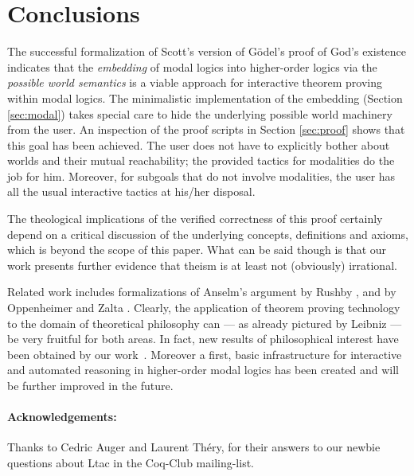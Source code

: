 \documentclass{llncs}
\begin{document}
\section{Conclusions}
\label{sec:conclusions}

The successful formalization of Scott's version of G\"odel's proof of
God's existence indicates that the \emph{embedding} of modal logics
into higher-order logics via the \emph{possible world semantics} is a
viable approach for interactive theorem proving within modal logics.
The minimalistic implementation of the embedding (Section
\ref{sec:modal}) takes special care to hide the underlying possible
world machinery from the user.  An inspection of the proof scripts in
Section \ref{sec:proof} shows that this goal has been achieved. The
user does not have to explicitly bother about worlds and their mutual
reachability; the provided tactics for modalities do the job for him.
Moreover, for subgoals that do not involve modalities, the user has all the
usual interactive tactics at his/her disposal.

The theological implications of the verified correctness of this proof
certainly depend on a critical discussion of the underlying concepts,
definitions and axioms, which is beyond the scope of this paper. What
can be said though is that our work presents further evidence that
theism is at least not (obviously) irrational. 

Related work includes formalizations of Anselm's argument by Rushby
\cite{Rushby}, and by Oppenheimer and Zalta \cite{Zalta}.  Clearly,
the application of theorem proving technology to the domain of
theoretical philosophy can --- as already pictured by Leibniz ---
be very fruitful for both areas. In fact, new results of
philosophical interest have been obtained by our
work~\cite{arXiv}. Moreover a first, basic infrastructure for
interactive and automated reasoning in higher-order modal logics has
been created and will be further improved in the future.



\paragraph{Acknowledgements:} Thanks to Cedric Auger and Laurent Th\'ery, for their answers to our newbie questions about Ltac in the Coq-Club mailing-list. 
\end{document}
